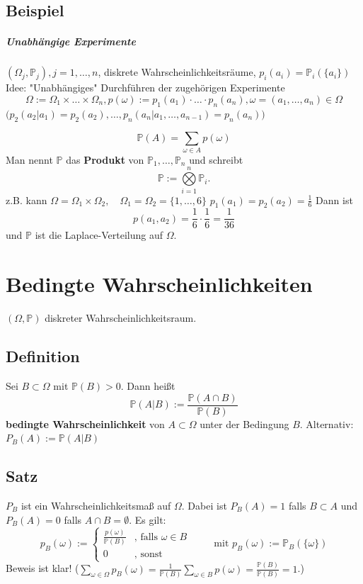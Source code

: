 \documentclass[a4paper,11pt,notitlepage]{report}
\newcommand{\Prim}{{\ensuremath{\mathbb{P}}}}
\begin{document}
\section{Beispiel}
\paragraph{Unabhängige Experimente}
$(\Omega_j,\Prim_j), j=1,\ldots,n$, diskrete Wahrscheinlichkeitsräume, $p_i(a_i)=\Prim_i(\{a_i\})$
\newline
Idee: "Unabhängiges" Durchführen der zugehörigen Experimente
$$\Omega := \Omega_1 \times \ldots \times \Omega_n, p(\omega):= p_1(a_1) \cdot \ldots \cdot p_n(a_n), \omega=(a_1, \ldots, a_n) \in \Omega$$
$\big(p_2(a_2|a_1) = p_2(a_2), \ldots, p_n(a_n|a_1, \ldots, a_{n-1})=p_n(a_n)\big)$

$$\Prim(A) = \sum\limits_{\omega \in A}{p(\omega)}$$
Man nennt $\Prim$ das \textbf{Produkt} von $\Prim_1, \ldots, \Prim_n$ und schreibt 
	$$\Prim := \bigotimes\limits_{i=1}^n{\Prim_i}.$$
	z.B. kann $\Omega = \Omega_1 \times \Omega_2, \quad \Omega_1 = \Omega_2 = \{1,\ldots,6\}$
	\newline
	$p_1(a_1)=p_2(a_2)=\frac{1}{6}$
	\newline
	Dann ist 
		$$p(a_1,a_2)=\frac{1}{6} \cdot \frac{1}{6} = \frac{1}{36}$$
		und $\Prim$ ist die Laplace-Verteilung auf $\Omega$.
		
\chapter{Bedingte Wahrscheinlichkeiten}
$(\Omega, \Prim)$ diskreter Wahrscheinlichkeitsraum.
\section{Definition}
Sei $B \subset \Omega$ mit $\Prim(B)>0$. Dann heißt
$$\Prim(A|B):=\frac{\Prim(A \cap B)}{\Prim(B)}$$
\textbf{bedingte Wahrscheinlichkeit} von $A \subset \Omega$ unter der Bedingung $B$.
\newline
Alternativ: $P_B(A):=\Prim(A|B)$

\section{Satz}
$P_B$ ist ein Wahrscheinlichkeitsmaß auf $\Omega$.
Dabei ist $P_B(A)=1$ falls $B \subset A$ und $P_B(A) = 0$ falls $A \cap B = \emptyset$.
Es gilt:
$$p_B(\omega):= \begin{cases}
		\frac{p(\omega)}{\Prim(B)} & \text{, falls } \omega \in B \\
			0 & \text{, sonst}
	\end{cases} \qquad \text{ mit } p_B(\omega):=\Prim_B(\{\omega\})$$
	Beweis ist klar! ($\sum\limits_{\omega \in \Omega}{p_B(\omega)} = \frac{1}{\Prim(B)} \sum \limits_{\omega \in B}{p(\omega)} = \frac{\Prim(B)}{\Prim(B)}=1$.)
	
\end{document}
